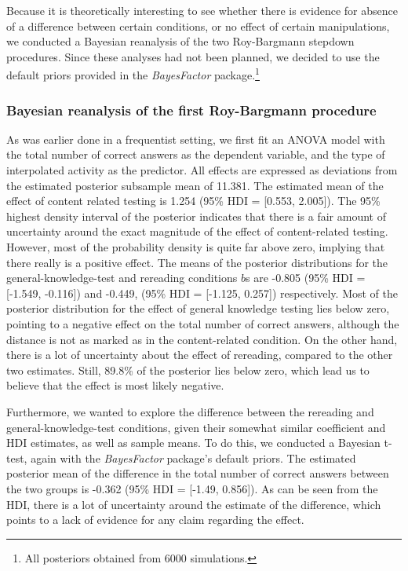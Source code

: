 \documentclass[../main.tex]{subfiles}
\begin{document}
Because it is theoretically interesting to see whether there is evidence
for absence of a difference between certain conditions, or no effect of
certain manipulations, we conducted a Bayesian reanalysis of the two
Roy-Bargmann stepdown procedures. Since these analyses had not been
planned, we decided to use the default priors provided in the
\textit{BayesFactor} \citep{moreyBayesFactorComputationBayes2018}
package.\footnote{All posteriors obtained from 6000 simulations.}

\hypertarget{bayesian-reanalysis-of-the-first-roy-bargmann-procedure}{%
\subsubsection{Bayesian reanalysis of the first Roy-Bargmann
procedure}\label{bayesian-reanalysis-of-the-first-roy-bargmann-procedure}}

As was earlier done in a frequentist setting, we first fit an ANOVA
model with the total number of correct answers as the dependent
variable, and the type of interpolated activity as the predictor. All
effects are expressed as deviations from the estimated posterior
subsample mean of 11.381. The estimated mean of the effect of content
related testing is 1.254 (95\% HDI = {[}0.553, 2.005{]}). The 95\%
highest density interval of the posterior indicates that there is a fair
amount of uncertainty around the exact magnitude of the effect of
content-related testing. However, most of the probability density is
quite far above zero, implying that there really is a positive effect.
The means of the posterior distributions for the general-knowledge-test
and rereading conditions \(b\)s are -0.805 (95\% HDI = {[}-1.549,
-0.116{]}) and -0.449, (95\% HDI = {[}-1.125, 0.257{]}) respectively.
Most of the posterior distribution for the effect of general knowledge
testing lies below zero, pointing to a negative effect on the total
number of correct answers, although the distance is not as marked as in
the content-related condition. On the other hand, there is a lot of
uncertainty about the effect of rereading, compared to the other two
estimates. Still, 89.8\% of the posterior lies below zero, which lead us
to believe that the effect is most likely negative.

Furthermore, we wanted to explore the difference between the rereading
and general-knowledge-test conditions, given their somewhat similar
coefficient and HDI estimates, as well as sample means. To do this, we
conducted a Bayesian t-test, again with the \textit{BayesFactor}
package's default priors. The estimated posterior mean of the difference
in the total number of correct answers between the two groups is -0.362
(95\% HDI = {[}-1.49, 0.856{]}). As can be seen from the HDI, there is a
lot of uncertainty around the estimate of the difference, which points
to a lack of evidence for any claim regarding the effect.
\end{document}
